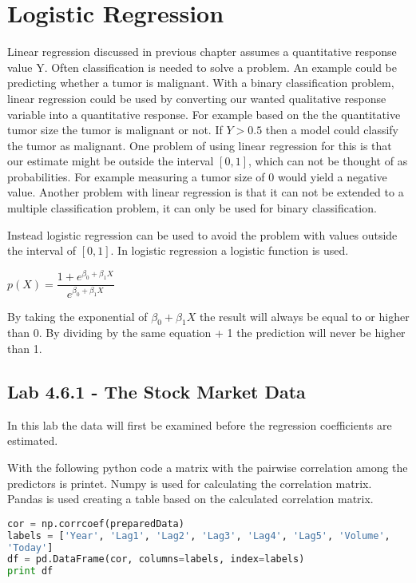 \chapter{Logistic Regression}
\label{chp:logreg}
Linear regression discussed in previous chapter assumes a quantitative response value Y. Often classification is needed to solve a problem. An example could be predicting whether a tumor is malignant. With a binary classification problem, linear regression could be used by converting our wanted qualitative response variable into a quantitative response. For example based on the the quantitative tumor size the tumor is malignant or not. If $Y > 0.5$ then a model could classify the tumor as malignant. One problem of using linear regression for this is that our estimate might be outside the interval $[0,1]$, which can not be thought of as probabilities. For example measuring a tumor size of 0 would yield a negative value. Another problem with linear regression is that it can not be extended to a multiple classification problem, it can only be used for binary classification.

Instead logistic regression can be used to avoid the problem with values outside the interval of $[0,1]$. In logistic regression a logistic function is used.

\begin{center}
	$p(X) = \dfrac{1+e^{\beta_0+ \beta_1 X}}{e^{\beta_0 + \beta_1 X}}$ 
\end{center}

By taking the exponential of $\beta_0 + \beta_1 X$ the result will always be equal to or higher than 0. By dividing by the same equation + 1 the prediction will never be higher than 1.

\section{Lab 4.6.1 - The Stock Market Data}
In this lab the data will first be examined before the regression coefficients are estimated. 

With the following python code a matrix with the pairwise correlation among the predictors is printet. Numpy is used for calculating the correlation matrix. Pandas is used creating a table based on the calculated correlation matrix.
\begin{lstlisting}[language=Python, caption=print correlation matrix]
cor = np.corrcoef(preparedData)
labels = ['Year', 'Lag1', 'Lag2', 'Lag3', 'Lag4', 'Lag5', 'Volume', 
'Today']
df = pd.DataFrame(cor, columns=labels, index=labels)
print df
\end{lstlisting}

